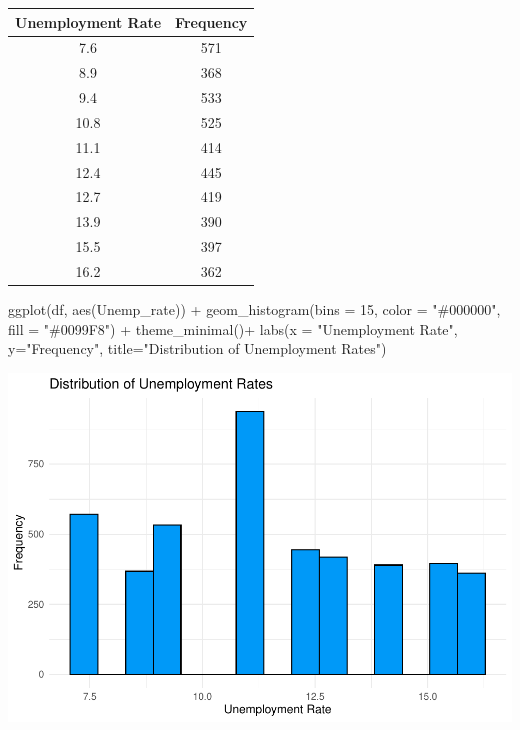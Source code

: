 \documentclass[
]{article}
\newenvironment{Shaded}{\begin{snugshade}}{\end{snugshade}}
\newcommand{\AttributeTok}[1]{\textcolor[rgb]{0.77,0.63,0.00}{#1}}
\newcommand{\DecValTok}[1]{\textcolor[rgb]{0.00,0.00,0.81}{#1}}
\newcommand{\FunctionTok}[1]{\textcolor[rgb]{0.00,0.00,0.00}{#1}}
\newcommand{\NormalTok}[1]{#1}
\newcommand{\SpecialCharTok}[1]{\textcolor[rgb]{0.00,0.00,0.00}{#1}}
\newcommand{\StringTok}[1]{\textcolor[rgb]{0.31,0.60,0.02}{#1}}
\begin{document}
\begin{table}
\centering
\begin{tabular}{c|c}
\hline
Unemployment Rate & Frequency\\
\hline
7.6 & 571\\
\hline
8.9 & 368\\
\hline
9.4 & 533\\
\hline
10.8 & 525\\
\hline
11.1 & 414\\
\hline
12.4 & 445\\
\hline
12.7 & 419\\
\hline
13.9 & 390\\
\hline
15.5 & 397\\
\hline
16.2 & 362\\
\hline
\end{tabular}
\end{table}

\begin{Shaded}
\begin{Highlighting}[]
\FunctionTok{ggplot}\NormalTok{(df, }\FunctionTok{aes}\NormalTok{(Unemp\_rate)) }\SpecialCharTok{+}
  \FunctionTok{geom\_histogram}\NormalTok{(}\AttributeTok{bins =} \DecValTok{15}\NormalTok{, }\AttributeTok{color =} \StringTok{"\#000000"}\NormalTok{, }\AttributeTok{fill =} \StringTok{"\#0099F8"}\NormalTok{) }\SpecialCharTok{+} \FunctionTok{theme\_minimal}\NormalTok{()}\SpecialCharTok{+}
  \FunctionTok{labs}\NormalTok{(}\AttributeTok{x =} \StringTok{"Unemployment Rate"}\NormalTok{, }\AttributeTok{y=}\StringTok{"Frequency"}\NormalTok{, }\AttributeTok{title=}\StringTok{"Distribution of Unemployment Rates"}\NormalTok{)}
\end{Highlighting}
\end{Shaded}

\includegraphics{midterm_files/figure-latex/unnamed-chunk-13-1.pdf}
\end{document}
